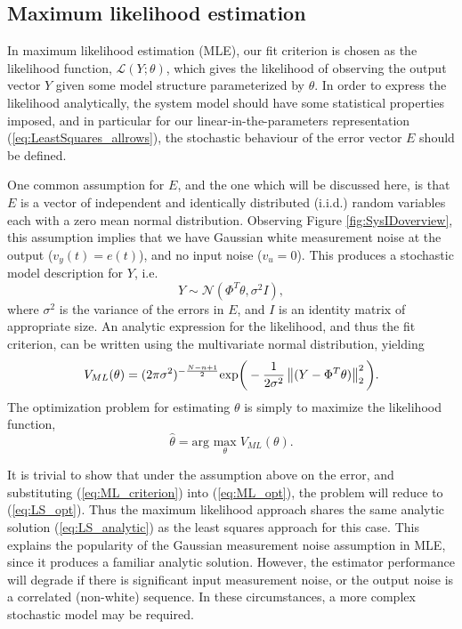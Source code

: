 \subsection{Maximum likelihood estimation}

In maximum likelihood estimation (MLE), our fit criterion is chosen as the likelihood function, $\mathcal{L}(Y;\theta)$, which gives the likelihood of observing the output vector $Y$ given some model structure parameterized by $\theta$. In order to express the likelihood analytically, the system model should have some statistical properties imposed, and in particular for our linear-in-the-parameters representation (\ref{eq:LeastSquares_allrows}), the stochastic behaviour of the error vector $E$ should be defined.

One common assumption for $E$, and the one which will be discussed here, is that $E$ is a vector of independent and identically distributed (i.i.d.) random variables each with a zero mean normal distribution. Observing Figure \ref{fig:SysIDoverview}, this assumption implies that we have Gaussian white measurement noise at the output ($v_y(t) = e(t)$), and no input noise ($v_u = 0$). This produces a stochastic model description for $Y$, i.e.
\begin{equation}
Y \sim \mathcal{N}(\Phi^T \theta,\sigma^2 I),
\end{equation}
where $\sigma^2$ is the variance of the errors in $E$, and $I$ is an identity matrix of appropriate size. An analytic expression for the likelihood, and thus the fit criterion, can be written using the multivariate normal distribution, yielding
\begin{equation}
V_{ML}(\theta) = (2 \pi \sigma^2)^{-\frac{N-n+1}{2}} \text{exp}\bigg( -\frac{1}{2 \sigma^2} \left\lVert(Y-\Phi^T \theta)\right\rVert_2^2 \bigg).
\label{eq:ML_criterion}
\end{equation}
The optimization problem for estimating $\theta$ is simply to maximize the likelihood function,
\begin{equation}
\hat{\theta} = \text{arg } \underset{\theta}{\text{max}} \; V_{ML}(\theta).
\label{eq:ML_opt}
\end{equation}

It is trivial to show that under the assumption above on the error, and substituting (\ref{eq:ML_criterion}) into (\ref{eq:ML_opt}), the problem will reduce to (\ref{eq:LS_opt}). Thus the maximum likelihood approach shares the same analytic solution (\ref{eq:LS_analytic}) as the least squares approach for this case. This explains the popularity of the Gaussian measurement noise assumption in MLE, since it produces a familiar analytic solution. However, the estimator performance will degrade if there is significant input measurement noise, or the output noise is a correlated (non-white) sequence. In these circumstances, a more complex stochastic model may be required.

